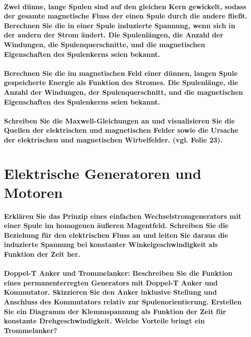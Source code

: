 \documentclass[a4paper, 11pt, parskip=half]{scrartcl}
\begin{document}
\paragraph{Zwei dünne, lange Spulen sind auf den gleichen Kern gewickelt, sodass der gesamte
magnetische Fluss der einen Spule durch die andere fließt. Berechnen Sie die in einer Spule
induzierte Spannung, wenn sich in der andern der Strom ändert. Die Spulenlängen, die Anzahl der
Windungen, die Spulenquerschnitte, und die magnetischen Eigenschaften des Spulenkerns seien
bekannt.}

\paragraph{Berechnen Sie die im magnetischen Feld einer dünnen, langen Spule gespeicherte Energie
als Funktion des Stromes. Die Spulenlänge, die Anzahl der Windungen, der Spulenquerschnitt, und die
magnetischen Eigenschaften des Spulenkerns seien bekannt.}

\paragraph{Schreiben Sie die Maxwell-Gleichungen an und visualisieren Sie die Quellen der
elektrischen und magnetischen Felder sowie die Ursache der elektrischen und magnetischen
Wirbelfelder. (vgl. Folie 23).}

\newpage

\section{Elektrische Generatoren und Motoren}

\paragraph{Erklären Sie das Prinzip eines einfachen Wechselstromgenerators mit einer Spule im
homogenen äußeren Magentfeld. Schreiben Sie die Beziehung für den elektrischen Fluss an und leiten
Sie daraus die induzierte Spannung bei konstanter Winkelgeschwindigkeit als Funktion der Zeit her.}

\paragraph{Doppel-T Anker und Trommelanker: Beschreiben Sie die Funktion eines permanenterregten
Generators mit Doppel-T Anker und Kommutator. Skizzieren Sie den Anker inklusive Stellung und
Anschluss des Kommutators relativ zur Spulenorientierung. Erstellen Sie ein Diagramm der
Klemmspannung als Funktion der Zeit für konstante Drehgeschwindigkeit. Welche Vorteile bringt ein
Trommelanker?}
\end{document}
